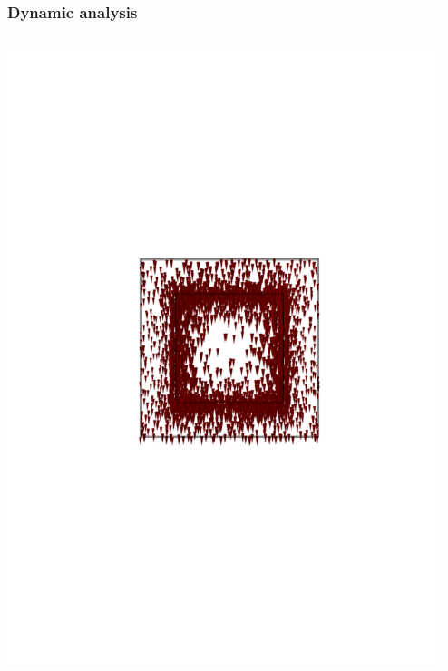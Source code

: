 \documentclass[compress]{beamer}
\begin{document}
\begin{frame}\frametitle{Dynamic analysis}
\begin{columns}[totalwidth=\textwidth]
	\begin{column}{.35\textwidth}
	\centering
	\includegraphics[width=0.99\textwidth]{Graphic/04_B3cubemagnefield300k_XZview.pdf}
	\end{column}
	\begin{column}{.35\textwidth}
	\centering	

\end{column}
\end{columns}
\end{frame}
\end{document}
